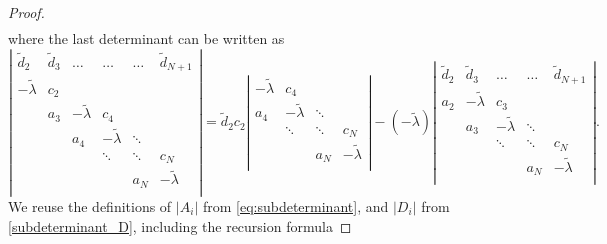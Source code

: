 \documentclass[10pt,a4paper]{amsart}
\begin{document}
\begin{proof}
\begin{eqnarray*}
    \end{eqnarray*}
    where the last determinant can be written as
    \begin{equation*}
        \left|
        \begin{array}{cccccc}
         \widetilde{d}_{2} & \widetilde{d}_{3} & \hdots & \dots & \dots & \widetilde{d}_{{N+1}} \\
          -\widetilde{\lambda} & c_2 & & & &   \\
         & a_3 & -\widetilde{\lambda} & c_4 & &\\
         &   & a_4 & -\widetilde{\lambda} & \ddots   \\
         &   &  & \ddots & \ddots & c_N   \\
         &   & & & a_N & -\widetilde{\lambda}   \\
        \end{array}
        \right| = \widetilde{d}_{2} c_2 \left|
        \begin{array}{cccc}
           -\widetilde{\lambda} & c_4  &  &   \\
          a_4 & -\widetilde{\lambda} & \ddots  &   \\
        & \ddots & \ddots & c_N \\
         &  & a_N & -\widetilde{\lambda}   \\
        \end{array}
        \right| - (-\widetilde{\lambda})  \left|
        \begin{array}{cccccc}
          \widetilde{d}_{2} & \widetilde{d}_{3} & \dots & \dots & \widetilde{d}_{{N+1}} \\
          a_2 &  -\widetilde{\lambda} & c_3  &  & \\
        & a_3 & -\widetilde{\lambda} & \ddots & \\
        & & \ddots & \ddots & c_N \\
         & &   & a_N & -\widetilde{\lambda}   \\
        \end{array}
        \right|.
    \end{equation*}
    We reuse the definitions of $|A_i|$ from \eqref{eq:subdeterminant}, and $|D_i|$ from \eqref{subdeterminant_D}, including the recursion formula

\end{proof}
\end{document}
